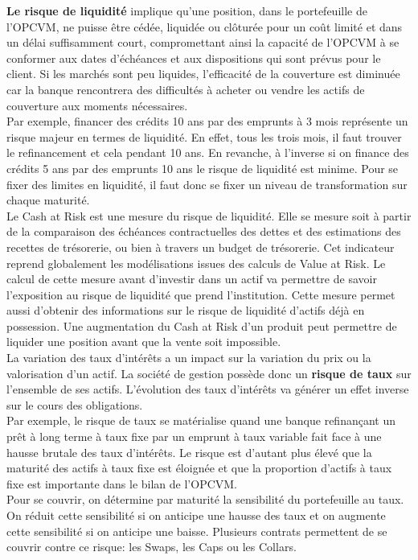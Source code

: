 \documentclass[french,12pt,a4paper]{article}
\begin{document}
\indent \textbf{Le risque de liquidité} implique qu'une position, dans le portefeuille de l'OPCVM, ne puisse être cédée, liquidée ou clôturée pour un coût limité et dans un délai suffisamment court, compromettant ainsi la capacité de l'OPCVM à se conformer aux dates d'échéances et aux dispositions qui sont prévus pour le client. Si les marchés sont peu liquides, l'efficacité de la couverture est diminuée car la banque rencontrera des difficultés à acheter ou vendre les actifs de couverture aux moments nécessaires. \\
\indent Par exemple, financer des crédits 10 ans par des emprunts à 3 mois représente un risque majeur en termes de liquidité. En effet, tous les trois mois, il faut trouver le refinancement et cela pendant 10 ans. En revanche, à l'inverse si on finance des crédits 5 ans par des emprunts 10 ans le risque de liquidité est minime. Pour se fixer des limites en liquidité, il faut donc se fixer un niveau de transformation sur chaque maturité. \\
\indent Le Cash at Risk est une mesure du risque de liquidité. Elle se mesure soit à partir de la comparaison des échéances contractuelles des dettes et des estimations des recettes de trésorerie, ou bien à travers un budget de trésorerie. Cet indicateur reprend globalement les modélisations issues des calculs de Value at Risk. Le calcul de cette mesure avant d'investir dans un actif va permettre de savoir l'exposition au risque de liquidité que prend l'institution. Cette mesure permet aussi d'obtenir des informations sur le risque de liquidité d'actifs déjà en possession. Une augmentation du Cash at Risk d'un produit peut permettre de liquider une position avant que la vente soit impossible. 
\\

\indent La variation des taux d'intérêts a un impact sur la variation du prix ou la valorisation d'un actif. La société de gestion possède donc un \textbf{risque de taux} sur l'ensemble de ses actifs. L'évolution des taux d'intérêts va générer un effet inverse sur le cours des obligations. \\
\indent Par exemple, le risque de taux se matérialise quand une banque refinançant un prêt à long terme à taux fixe par un emprunt à taux variable fait face à une hausse brutale des taux d'intérêts. Le risque est d'autant plus élevé que la maturité des actifs à taux fixe est éloignée et que la proportion d'actifs à taux fixe est importante dans le bilan de l'OPCVM.\\
\indent Pour se couvrir, on détermine par maturité la sensibilité du portefeuille au taux. On réduit cette sensibilité si on anticipe une hausse des taux et on augmente cette sensibilité si on anticipe une baisse. Plusieurs contrats permettent de se couvrir contre ce risque: les Swaps, les Caps ou les Collars.\\
\end{document}
